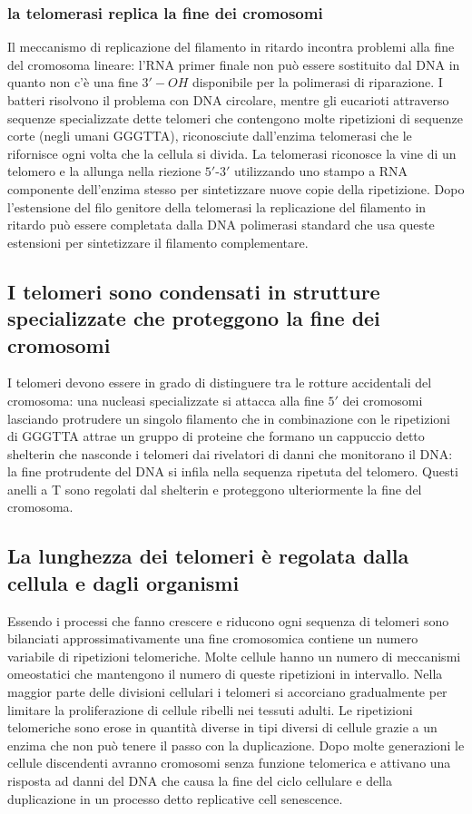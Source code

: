 \subsubsection{la telomerasi replica la fine dei cromosomi}
Il meccanismo di replicazione del filamento in ritardo incontra problemi alla fine del cromosoma lineare: l'RNA primer finale non pu\`o essere sostituito dal DNA in quanto non c'\`e una
fine $3'-OH$ disponibile per la polimerasi di riparazione. I batteri risolvono il problema con DNA circolare, mentre gli eucarioti attraverso sequenze specializzate dette telomeri
che contengono molte ripetizioni di sequenze corte (negli umani GGGTTA), riconosciute dall'enzima telomerasi che le rifornisce ogni volta che la cellula si divida. La telomerasi 
riconosce la vine di un telomero e la allunga nella riezione $5'$-$3'$ utilizzando uno stampo a RNA componente dell'enzima stesso per sintetizzare nuove copie della ripetizione. Dopo
l'estensione del filo genitore della telomerasi la replicazione del filamento in ritardo pu\`o essere completata dalla DNA polimerasi standard che usa queste estensioni per sintetizzare
il filamento complementare. 
\subsection{I telomeri sono condensati in strutture specializzate che proteggono la fine dei cromosomi}
I telomeri devono essere in grado di distinguere tra le rotture accidentali del cromosoma: una nucleasi specializzate si attacca alla fine $5'$ dei cromosomi lasciando protrudere un 
singolo filamento che in combinazione con le ripetizioni di GGGTTA attrae un gruppo di proteine che formano un cappuccio detto shelterin che nasconde i telomeri dai rivelatori di 
danni che monitorano il DNA: la fine protrudente del DNA si infila nella sequenza ripetuta del telomero. Questi anelli a T sono regolati dal shelterin e proteggono ulteriormente la 
fine del cromosoma. 
\subsection{La lunghezza dei telomeri \`e regolata dalla cellula e dagli organismi}
Essendo i processi che fanno crescere e riducono ogni sequenza di telomeri sono bilanciati approssimativamente una fine cromosomica contiene un numero variabile di ripetizioni 
telomeriche. Molte cellule hanno un numero di meccanismi omeostatici che mantengono il numero di queste ripetizioni in intervallo. Nella maggior parte delle divisioni cellulari i 
telomeri si accorciano gradualmente per limitare la proliferazione di cellule ribelli nei tessuti adulti. Le ripetizioni telomeriche sono erose in quantit\`a diverse in tipi diversi di 
cellule grazie a un enzima che non pu\`o tenere il passo con la duplicazione. Dopo molte generazioni le cellule discendenti avranno cromosomi senza funzione telomerica e attivano una
risposta ad danni del DNA che causa la fine del ciclo cellulare e della duplicazione in un processo detto replicative cell senescence. 
